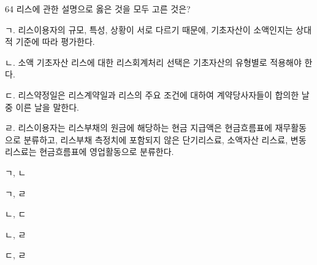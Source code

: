 \begin{question}{64}
리스에 관한 설명으로 옳은 것을 모두 고른 것은?
\begin{framedtext}
ㄱ. 리스이용자의 규모, 특성, 상황이 서로 다르기 때문에, 기초자산이 소액인지는 상대적 기준에 따라 평가한다. \par
ㄴ. 소액 기초자산 리스에 대한 리스회계처리 선택은 기초자산의 유형별로 적용해야 한다. \par
ㄷ. 리스약정일은 리스계약일과 리스의 주요 조건에 대하여 계약당사자들이 합의한 날 중 이른 날을 말한다. \par
ㄹ. 리스이용자는 리스부채의 원금에 해당하는 현금 지급액은 현금흐름표에 재무활동으로 분류하고, 리스부채 측정치에 포함되지 않은 단기리스료, 소액자산 리스료, 변동리스료는 현금흐름표에 영업활동으로 분류한다. \par
\end{framedtext}
\begin{choices}
  \item ㄱ, ㄴ
  \item ㄱ, ㄹ
  \item ㄴ, ㄷ
  \item ㄴ, ㄹ
  \item ㄷ, ㄹ
\end{choices}
\end{question}
